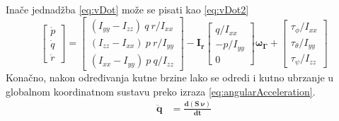 \documentclass[times, utf8, diplomski]{fer}
\begin{document}
Inače jednadžba \ref{eq:vDot} može se pisati kao \ref{eq:vDot2}
\begin{equation}
	\begin{bmatrix}
	\dot{p} \\
	\dot{q} \\
	\dot{r}
	\end{bmatrix}
	=
	\begin{bmatrix}
	(I_{yy}-I_{zz})~q~r/I_{xx} \\
	(I_{zz}-I_{xx})~p~r/I_{yy} \\
	(I_{xx}-I_{yy})~p~q/I_{zz}
	\end{bmatrix}
	-\mathbf{I_r}
	\begin{bmatrix}
	q/I_{xx} \\
	-p/I_{yy} \\
	0
	\end{bmatrix}
	\mathbf{\omega_{\Gamma}}+
	\begin{bmatrix}
	\tau_{\phi}/I_{xx} \\
	\tau_{\theta}/I_{yy} \\
	\tau_{\psi}/I_{zz}
	\end{bmatrix}
	\label{eq:vDot2}
\end{equation}
Konačno, nakon određivanja kutne brzine lako se odredi i kutno ubrzanje u globalnom koordinatnom sustavu preko izraza \ref{eq:angularAcceleration}.
\begin{align}
\mathbf{\ddot{q}}&=\mathbf{\frac{d(S~\nu)}{dt}} \label{eq:angularAcceleration}
\end{align}
\end{document}
